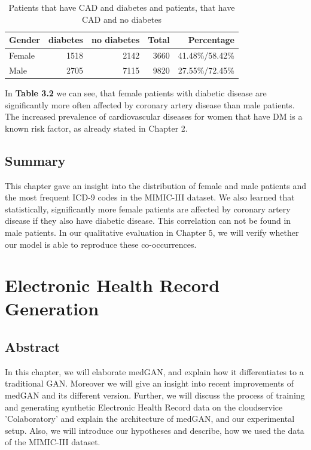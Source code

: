 \documentclass[11pt, a4paper]{book}
\begin{document}
\begin{table}
\begin{center}
\begin{tabularx}{\textwidth}{X|r|r|r|r}
Gender & diabetes & no diabetes & Total & Percentage\\
\hline
Female & 1518 & 2142 & 3660 & 41.48\%/58.42\%\\
Male 	& 2705 & 7115 & 9820 & 27.55\%/72.45\%\\
\end{tabularx}
\caption{\label{tab:cad-diabetic}Patients that have CAD and diabetes and patients, that have CAD and no diabetes}
\end{center}
\end{table}


In \textbf{Table 3.2} we can see, that female patients with diabetic disease are significantly more often affected by coronary artery disease than male patients. The increased prevalence of cardiovascular diseases for women that have DM is a known risk factor, as already stated in Chapter 2.


\section{Summary}
This chapter gave an insight into the distribution of female and male patients and the most frequent ICD-9 codes in the MIMIC-III dataset. We also learned that statistically, significantly more female patients are affected by coronary artery disease if they also have diabetic disease. This correlation can not be found in male patients.  
In our qualitative evaluation in Chapter 5, we will verify whether our model is able to reproduce these co-occurrences.

\chapter{Electronic Health Record Generation}
\section{Abstract}
In this chapter, we will elaborate medGAN, and explain how it differentiates to a traditional GAN. Moreover we will give an insight into recent improvements of medGAN and its different version. Further, we will discuss the process of training and generating synthetic Electronic Health Record data on the cloudservice 'Colaboratory' and explain the architecture of medGAN, and our experimental setup. Also, we will introduce our hypotheses and describe, how we used the data of the MIMIC-III dataset.
\end{document}
